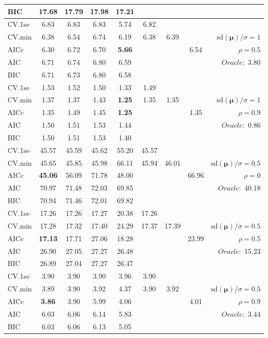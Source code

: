 \begin{table}
\begin{center}
\begin{tabular}{l*{7}{c}|r}
BIC & 17.68 & 17.79 & 17.98 & 17.21 & & & &  \\
 \hline 
CV.1se & 6.83 & 6.83 & 6.83 & 5.74 & 6.82 & & & \\
CV.min & 6.38 & 6.54 & 6.74 & 6.19 & 6.38 & 6.39 & & $\mathrm{sd}(\mathbf{\mu})/\sigma=1$ \\
AICc & 6.30 & 6.72 & 6.70 & {\bf 5.66} & & & 6.54 &  $\rho=0.5$ \\
AIC & 6.71 & 6.74 & 6.80 & 6.59 & & & &  \multirow{2}{*}{$Oracle: $ 3.80} \\
BIC & 6.71 & 6.73 & 6.80 & 6.58 & & & &  \\
 \hline 
CV.1se & 1.53 & 1.52 & 1.50 & 1.33 & 1.49 & & & \\
CV.min & 1.37 & 1.37 & 1.43 & {\bf 1.25} & 1.35 & 1.35 & & $\mathrm{sd}(\mathbf{\mu})/\sigma=1$ \\
AICc & 1.35 & 1.49 & 1.45 & {\bf 1.25} & & & 1.35 &  $\rho=0.9$ \\
AIC & 1.50 & 1.51 & 1.53 & 1.44 & & & &  \multirow{2}{*}{$Oracle: $ 0.86} \\
BIC & 1.50 & 1.51 & 1.53 & 1.40 & & & &  \\
 \hline 
CV.1se & 45.57 & 45.59 & 45.62 & 55.20 & 45.57 & & & \\
CV.min & 45.65 & 45.85 & 45.98 & 66.11 & 45.94 & 46.01 & & $\mathrm{sd}(\mathbf{\mu})/\sigma=0.5$ \\
AICc & {\bf 45.06} & 56.09 & 71.78 & 48.00 & & & 66.96 &  $\rho=0$ \\
AIC & 70.97 & 71.48 & 72.03 & 69.85 & & & &  \multirow{2}{*}{$Oracle: $ 40.18} \\
BIC & 70.94 & 71.46 & 72.01 & 69.82 & & & &  \\
 \hline 
CV.1se & 17.26 & 17.26 & 17.27 & 20.38 & 17.26 & & & \\
CV.min & 17.28 & 17.32 & 17.40 & 24.29 & 17.37 & 17.39 & & $\mathrm{sd}(\mathbf{\mu})/\sigma=0.5$ \\
AICc & {\bf 17.13} & 17.71 & 27.06 & 18.28 & & & 23.99 &  $\rho=0.5$ \\
AIC & 26.90 & 27.05 & 27.27 & 26.48 & & & &  \multirow{2}{*}{$Oracle: $ 15.23} \\
BIC & 26.89 & 27.04 & 27.27 & 26.47 & & & &  \\
 \hline 
CV.1se & 3.90 & 3.90 & 3.90 & 3.96 & 3.90 & & & \\
CV.min & 3.89 & 3.90 & 3.92 & 4.37 & 3.90 & 3.92 & & $\mathrm{sd}(\mathbf{\mu})/\sigma=0.5$ \\
AICc & {\bf 3.86} & 3.90 & 5.99 & 4.06 & & & 4.01 &  $\rho=0.9$ \\
AIC & 6.03 & 6.06 & 6.14 & 5.83 & & & &  \multirow{2}{*}{$Oracle: $ 3.44} \\
BIC & 6.03 & 6.06 & 6.13 & 5.05 & & & &  \\
 \hline 
\end{tabular}
\end{center}
\vspace{-1cm}
\end{table}




